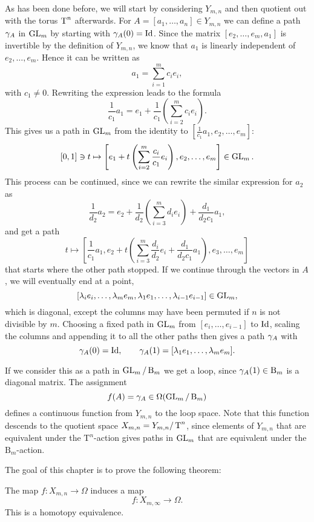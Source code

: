 As has been done before, we will start by considering $Y_{m,n}$ and
then quotient out with the torus $\operatorname{T}^n$ afterwards.
For $A = [a_1,\dots,a_n]\in Y_{m,n}$ we
can define a path $ \gamma_A$ in $\operatorname{GL}_m$ by starting with
$\gamma_A(0) = \operatorname{Id}$. Since the matrix $[e_2,\dots,e_m,a_1]$ is
invertible by the definition of $Y_{m,n}$, we know that $a_1$ is linearly
independent of $e_2,\dots,e_m$. Hence it can be written as
\[ a_1 = \sum_{i=1}^m c_i e_i, \]
with $c_1 \neq 0$. Rewriting the expression leads to the formula
\[  \frac{1}{c_1} a_1= e_1 + \frac{1}{c_1} \left(\sum_{i=2}^m c_i
  e_i\right). \]
This gives us a path in $\operatorname{GL}_m$ from the identity to
$\left[\frac{1}{c_1} a_1,e_2,\dots,e_m\right]$:
\[ [0,1]\ni t \mapsto \left[ e_1 + t\left(\sum_{i=2}^m
    \frac{c_i}{c_1}e_i\right),e_2,\dots,e_m \right] \in \operatorname{GL}_m. \]
This process can be continued, since we can rewrite the similar
expression for $a_2$ as
\[ \frac{1}{d_2}a_2 = e_2 + \frac{1}{d_2}\left(\sum_{i=3}^m d_i
  e_i\right) + \frac{d_1}{d_2c_1}a_1, \]
and get a path
\[ t\mapsto \left[\frac{1}{c_1}a_1,e_2+t\left(\sum_{i=3}^m
    \frac{d_i}{d_2}e_i +
    \frac{d_1}{d_2c_1}a_1\right),e_3,\dots,e_m\right] \]
that starts where the other path stopped. If we continue through the
vectors in $A$, we will eventually end at a point,
\[ [\lambda_i e_i,\dots,\lambda_me_m,\lambda_1e_1,\dots,\lambda_{i-1}e_{i-1}]\in \operatorname{GL}_m, \]
which is diagonal, except the columns may have been
permuted if $n$ is not divisible by $m$. Choosing a fixed path in
$\operatorname{GL}_m$ from $[e_i,\dots,e_{i-1}]$ to $\operatorname{Id}$, scaling the columns and
appending it to all the other paths then gives a path $ \gamma_A$ with
\[  \gamma_A(0) = \operatorname{Id}, \qquad \gamma_A(1) =
[\lambda_1e_1,\dots,\lambda_me_m]. \]

If we consider this as a path in $\operatorname{GL}_{m}/\operatorname{B}_{m}$ we
get a loop, since $\gamma_A(1)\in\operatorname{B}_m$ is a diagonal matrix. The
assignment
\[ f(A) = \gamma_A \in \Omega(\operatorname{GL}_{m}/\operatorname{B}_{m}) \]
defines a continuous function from $Y_{m,n}$ to the loop space. Note
that 
this function descends to the quotient space $X_{m,n}=Y_{m,n}/\operatorname{T}^n$, since
elements of $Y_{m,n}$ that are equivalent under the $\mathrm{T}^n$-action gives
paths in $\operatorname{GL}_m$ that are equivalent under the $\mathrm{B}_m$-action.

The goal of this chapter is to prove the following theorem:

\begin{theorem}
  The map $f : X_{m,n} \to \Omega$ induces a map
  \[ f : X_{m,\infty} \to \Omega. \]
  This is a homotopy equivalence.
\end{theorem}

